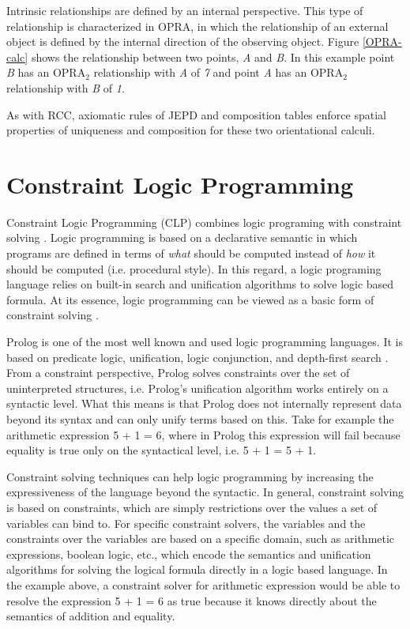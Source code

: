 \documentclass[12pt]{ucthesis}
\begin{document}
Intrinsic relationships are defined by an internal perspective. This type of relationship is characterized in OPRA, in which the relationship of an external object is defined by the internal direction of the observing object. Figure \ref{OPRA-calc} shows the relationship between two points, \emph{A} and \emph{B}. In this example point \emph{B} has an OPRA$_{2}$ relationship with \emph{A} of \emph{7} and point \emph{A} has an OPRA$_{2}$ relationship with \emph{B} of \emph{1}. 

As with RCC, axiomatic rules of JEPD and composition tables enforce spatial properties of uniqueness and composition for these two orientational calculi.

\section{Constraint Logic Programming}
Constraint Logic Programming (CLP) combines logic programing with constraint solving \cite{GavanelliCLP} \cite{WallaceCLP} \cite{Jaffar:1987:CLP}. Logic programming is based on a declarative semantic in which programs are defined in terms of \emph{what} should be computed instead of \emph{how} it should be computed (i.e. procedural style). In this regard, a logic programing language relies on built-in search and unification algorithms to solve logic based formula. At its essence, logic programming can be viewed as a basic form of constraint solving \cite{GavanelliCLP}. 

Prolog is one of the most well known and used logic programming languages. It is based on predicate logic, unification, logic conjunction, and depth-first search \cite{Sterling:1986}. From a constraint perspective, Prolog solves constraints over the set of uninterpreted structures, i.e. Prolog's unification algorithm works entirely on a syntactic level. What this means is that Prolog does not internally 
represent data beyond its syntax and can only unify terms based on this. Take for example the arithmetic expression 5 + 1 = 6, where in Prolog this expression will fail because equality is true only on the syntactical level, i.e. 5 + 1 = 5 + 1.  

Constraint solving techniques can help logic programming by increasing the expressiveness of the language beyond the syntactic. In general, constraint solving is based on constraints, which are simply restrictions over the values a set of variables can bind to. For specific constraint solvers, the variables and the constraints over the variables are based on a specific domain, such as arithmetic expressions, boolean logic, etc., which encode the semantics and unification algorithms for solving the logical formula directly in a logic based language. In the example above, a constraint solver for arithmetic expression would be able to resolve the expression 5 + 1 = 6 as true because it knows directly about the semantics of addition and equality. 
\end{document}

